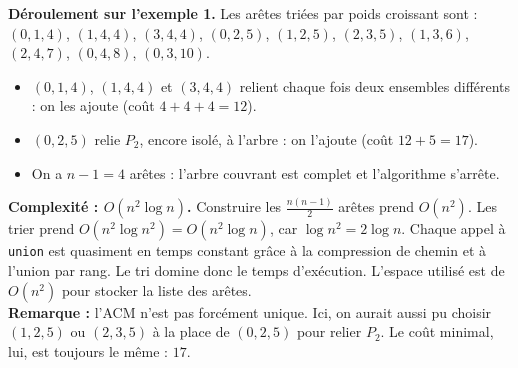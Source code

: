 \begin{Exercice}[25 minutes] [Python]
\begin{solution}
        
    \end{solution}
    \begin{solution}
        \textbf{Déroulement sur l'exemple 1.} Les arêtes triées par poids croissant sont :
        $(0,1,4)$, $(1,4,4)$, $(3,4,4)$, $(0,2,5)$, $(1,2,5)$, $(2,3,5)$, $(1,3,6)$, $(2,4,7)$, $(0,4,8)$, $(0,3,10)$.
        \begin{itemize}
            \item $(0,1,4)$, $(1,4,4)$ et $(3,4,4)$ relient chaque fois deux ensembles différents : on les ajoute (coût $4 + 4 + 4 = 12$).
            \item $(0,2,5)$ relie $P_2$, encore isolé, à l'arbre : on l'ajoute (coût $12 + 5 = 17$).
            \item On a $n - 1 = 4$ arêtes : l'arbre couvrant est complet et l'algorithme s'arrête.
        \end{itemize}
        \begin{center}
        \end{center}

        \textbf{Complexité : $O(n^2 \log n)$.} Construire les $\frac{n(n-1)}{2}$ arêtes prend $O(n^2)$. Les trier prend $O(n^2 \log n^2) = O(n^2 \log n)$, car $\log n^2 = 2 \log n$. Chaque appel à \lstinline{union} est quasiment en temps constant grâce à la compression de chemin et à l'union par rang. Le tri domine donc le temps d'exécution. L'espace utilisé est de $O(n^2)$ pour stocker la liste des arêtes.\\

        \textbf{Remarque :} l'ACM n'est pas forcément unique. Ici, on aurait aussi pu choisir $(1,2,5)$ ou $(2,3,5)$ à la place de $(0,2,5)$ pour relier $P_2$. Le coût minimal, lui, est toujours le même : $17$.
    \end{solution}

\end{Exercice}


